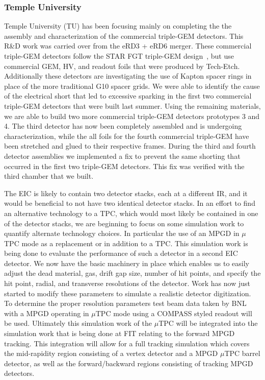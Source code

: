 \subsubsection{Temple University} 
Temple University (TU) has been focusing mainly on completing the the assembly and characterization of the commercial triple-GEM detectors. This R\&D work was carried over from the eRD3 + eRD6 merger. These commercial triple-GEM detectors follow the STAR FGT triple-GEM design~\cite{STARfgt}, but use commercial GEM, HV, and readout foils that were produced by Tech-Etch. Additionally these detectors are investigating the use of Kapton spacer rings in place of the more traditional G10 spacer grids. We were able to identify the cause of the electrical short that led to excessive sparking in the first two commercial triple-GEM detectors that were built last summer. Using the remaining materials, we are able to build two more commercial triple-GEM detectors prototypes 3 and 4. The third detector has now been completely assembled and is undergoing characterization, while the all foils for the fourth commercial triple-GEM have been stretched and glued to their respective frames. During the third and fourth detector assemblies we implemented a fix to prevent the same shorting that occurred in the first two triple-GEM detectors. This fix was verified with the third chamber that we built.

 The EIC is likely to contain two detector stacks, each at a different IR, and it would be beneficial to not have two identical detector stacks. In an effort to find an alternative technology to a TPC, which would most likely be contained in one of the detector stacks, we are beginning to focus on some simulation work to quantify alternate technology choices. In particular the use of an MPGD in $\mu$TPC mode as a replacement or in addition to a TPC. This simulation work is being done to evaluate the performance of such a detector in a second EIC detector. We now have the basic machinery in place which enables us to easily adjust the dead material, gas, drift gap size, number of hit points, and specify the hit point, radial, and transverse resolutions of the detector. Work has now just started to modify these parameters to simulate a realistic detector digitization. To determine the proper resolution parameters test beam data taken by BNL with a MPGD operating in $\mu$TPC mode using a COMPASS styled readout will be used. Ultimately this simulation work of the $\mu$TPC will be integrated into the simulation work that is being done at FIT relating to the forward MPGD tracking. This integration will allow for a full tracking simulation which covers the mid-rapidity region consisting of a vertex detector and a MPGD $\mu$TPC barrel detector, as well as the forward/backward regions consisting of tracking MPGD detectors.